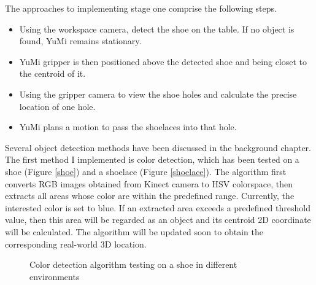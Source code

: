 The approaches to implementing stage one comprise the following steps.
\begin{itemize}
 \item Using the workspace camera, detect the shoe on the table. If no object is found, YuMi remains stationary.
 \item YuMi gripper is then positioned above the detected shoe and being closet to the centroid of it. 
 \item Using the gripper camera to view the shoe holes and calculate the precise location of one hole.
 \item YuMi plans a motion to pass the shoelaces into that hole.
\end{itemize}

Several object detection methods have been discussed in the background chapter. The first method I implemented is color detection, which has been tested on a shoe (Figure \ref{shoe}) and a shoelace (Figure \ref{shoelace}). The algorithm first converts RGB images obtained from Kinect camera to HSV colorspace, then extracts all areas whose color are within the predefined range. Currently, the interested color is set to blue. If an extracted area exceeds a predefined threshold value, then this area will be regarded as an object and its centroid 2D coordinate will be calculated. The algorithm will be updated soon to obtain the corresponding real-world 3D location. 
\begin{figure}[H]
\centering
%
%
%
\caption{Color detection algorithm testing on a shoe in different environments}%
\label{}%
\end{figure}
